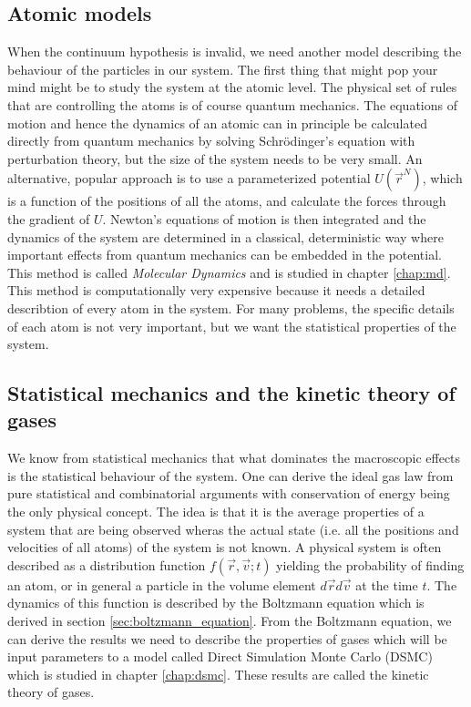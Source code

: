 \subsection{Atomic models}
When the continuum hypothesis is invalid, we need another model describing the behaviour of the particles in our system. The first thing that might pop your mind might be to study the system at the atomic level. The physical set of rules that are controlling the atoms is of course quantum mechanics. The equations of motion and hence the dynamics of an atomic can in principle be calculated directly from quantum mechanics by solving Schrödinger's equation with perturbation theory, but the size of the system needs to be very small. An alternative, popular approach is to use a parameterized potential $U(\vec r^N)$, which is a function of the positions of all the atoms, and calculate the forces through the gradient of $U$. Newton's equations of motion is then integrated and the dynamics of the system are determined in a classical, deterministic way where important effects from quantum mechanics can be embedded in the potential. This method is called \textit{Molecular Dynamics} and is studied in chapter \ref{chap:md}. This method is computationally very expensive because it needs a detailed describtion of every atom in the system. For many problems, the specific details of each atom is not very important, but we want the statistical properties of the system.
\subsection{Statistical mechanics and the kinetic theory of gases}
We know from statistical mechanics that what dominates the macroscopic effects is the statistical behaviour of the system. One can derive the ideal gas law from pure statistical and combinatorial arguments with conservation of energy being the only physical concept\cite{ravndal2008statmech}. The idea is that it is the average properties of a system that are being observed wheras the actual state (i.e. all the positions and velocities of all atoms) of the system is not known. A physical system is often described as a distribution function $f(\vec r, \vec v; t)$ yielding the probability of finding an atom, or in general a particle in the volume element $d\vec r d\vec v$ at the time $t$. The dynamics of this function is described by the Boltzmann equation which is derived in section \ref{sec:boltzmann_equation}. From the Boltzmann equation, we can derive  the results we need to describe the properties of gases which will be input parameters to a model called Direct Simulation Monte Carlo (DSMC) which is studied in chapter \ref{chap:dsmc}. These results are called the kinetic theory of gases.
